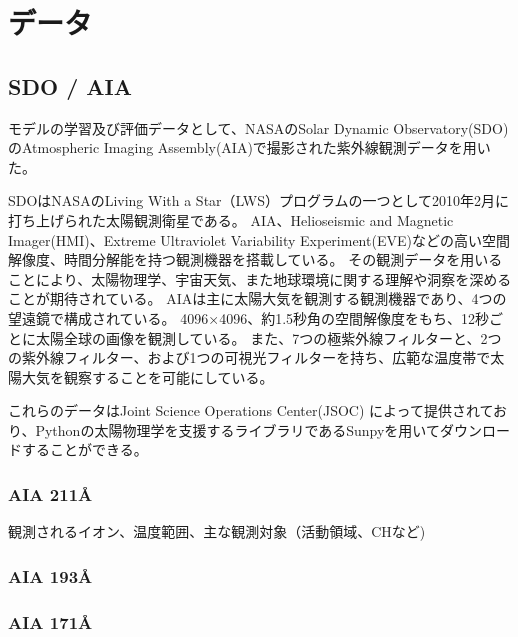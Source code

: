 \chapter{データ} 

\section{SDO / AIA}
モデルの学習及び評価データとして、NASAのSolar Dynamic Observatory(SDO)\cite{pesnell2012solar}のAtmospheric Imaging Assembly(AIA)\cite{lemen2012atmospheric}で撮影された紫外線観測データを用いた。

SDOはNASAのLiving With a Star（LWS）プログラムの一つとして2010年2月に打ち上げられた太陽観測衛星である。
AIA、Helioseismic and Magnetic Imager(HMI)、Extreme Ultraviolet Variability Experiment(EVE)などの高い空間解像度、時間分解能を持つ観測機器を搭載している。
その観測データを用いることにより、太陽物理学、宇宙天気、また地球環境に関する理解や洞察を深めることが期待されている。
AIAは主に太陽大気を観測する観測機器であり、4つの望遠鏡で構成されている。
4096×4096、約1.5秒角の空間解像度をもち、12秒ごとに太陽全球の画像を観測している。
また、7つの極紫外線フィルターと、2つの紫外線フィルター、および1つの可視光フィルターを持ち、広範な温度帯で太陽大気を観察することを可能にしている。

これらのデータはJoint Science Operations Center(JSOC) によって提供されており、Pythonの太陽物理学を支援するライブラリであるSunpyを用いてダウンロードすることができる。


\subsection{AIA 211Å}
観測されるイオン、温度範囲、主な観測対象（活動領域、CHなど)

\subsection{AIA 193Å}
\subsection{AIA 171Å}

